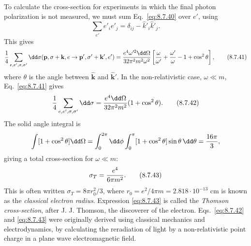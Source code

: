 To calculate the cross-section for experiments in which the final photon
polarization is not measured, we must sum Eq.~\eqref{eq:8.7.40} over $e'$, using
\[
\sum_{e'}e'_i e'_j=\delta_{ij}-\hat k'_i\hat k'_j.
\]
This gives
\begin{equation}
{1\over4}\sum_{e,e',\sigma,\sigma'}\dd\sigma(\mathbf p,\sigma+\mathbf k,e
\to\mathbf p',\sigma'+\mathbf k',e')
={e^4\omega'^2\dd\Omega\over32\pi^2m^2\omega^2}
\left[{\omega\over\omega'}+{\omega'\over\omega}-1+\cos^2\theta\right],
\tag{8.7.41}\label{eq:8.7.41}
\end{equation}
where $\theta$ is the angle between $\hat{\mathbf k}$ and
$\hat{\mathbf k}'$. In the non-relativistic case, $\omega\ll m$,
Eq.~\eqref{eq:8.7.41} gives
\begin{equation}
{1\over4}\sum_{e,e',\sigma,\sigma'}\dd\sigma
={e^4\dd\Omega\over32\pi^2m^2}(1+\cos^2\theta).
\tag{8.7.42}\label{eq:8.7.42}
\end{equation}
The solid angle integral is
\[
\int[1+\cos^2\theta]\dd\Omega
=\int_0^{2\pi}\dd\phi\int_0^\pi[1+\cos^2\theta]\sin\theta\,\dd\theta
={16\pi\over3},
\]
giving a total cross-section for $\omega\ll m$:
\begin{equation}
\sigma_T={e^4\over6\pi m^2}.
\tag{8.7.43}\label{eq:8.7.43}
\end{equation}
This is often written $\sigma_T=8\pi r_0^2/3$, where
$r_0=e^2/4\pi m=2.818\cdot10^{-13}$ cm is known as the \emph{classical
electron radius}. Expression \eqref{eq:8.7.43} is called the \emph{Thomson
cross-section}, after J. J. Thomson, the discoverer of the electron.
Eqs.~\eqref{eq:8.7.42} and \eqref{eq:8.7.43} were originally derived using classical mechanics
and electrodynamics, by calculating the reradiation of light by a
non-relativistic point charge in a plane wave electromagnetic field.
